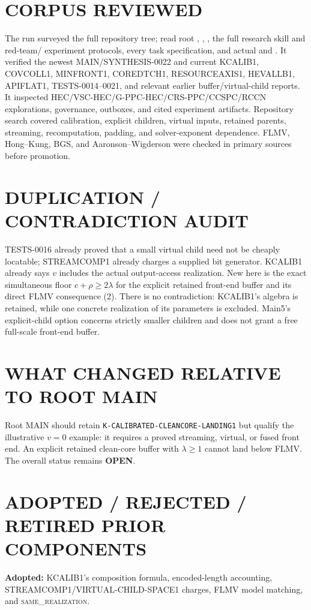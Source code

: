 \documentclass[11pt]{article}
\newcommand{\OPEN}{\textbf{OPEN}}
\newcommand{\same}{\textsc{same\_realization}}
\begin{document}
\section{CORPUS REVIEWED}
The run surveyed the full repository tree; read root ,
, , the full research skill and red-team/
experiment protocols, every task specification, and actual 
and .  It verified the newest MAIN/SYNTHESIS-0022 and current
KCALIB1, COVCOLL1, MINFRONT1, COREDTCH1, RESOURCEAXIS1, HEVALLB1, APIFLAT1,
TESTS-0014--0021, and relevant earlier buffer/virtual-child reports.  It
inspected HEC/VSC-HEC/G-PPC-HEC/CRS-PPC/CCSPC/RCCN explorations, governance,
outboxes, and cited experiment artifacts.  Repository search covered
calibration, explicit children, virtual inputs, retained parents, streaming,
recomputation, padding, and solver-exponent dependence.  FLMV, Hong--Kung,
BGS, and Aaronson--Wigderson were checked in primary sources before promotion.

\section{DUPLICATION / CONTRADICTION AUDIT}
TESTS-0016 already proved that a small virtual child need not be cheaply
locatable; STREAMCOMP1 already charges a supplied bit generator.  KCALIB1
already says $v$ includes the actual output-access realization.  New here is
the exact simultaneous floor $c+\rho\ge2\lambda$ for the explicit retained
front-end buffer and its direct FLMV consequence (2).  There is no
contradiction: KCALIB1's algebra is retained, while one concrete realization
of its parameters is excluded.  Main5's explicit-child option concerns
strictly smaller children and does not grant a free full-scale front-end
buffer.

\section{WHAT CHANGED RELATIVE TO ROOT MAIN}
Root MAIN should retain \texttt{K-CALIBRATED-CLEANCORE-LANDING1} but qualify
the illustrative $v=0$ example: it requires a proved streaming, virtual, or
fused front end.  An explicit retained clean-core buffer with $\lambda\ge1$
cannot land below FLMV.  The overall status remains \OPEN.

\section{ADOPTED / REJECTED / RETIRED PRIOR COMPONENTS}
\textbf{Adopted:} KCALIB1's composition formula, encoded-length accounting,
STREAMCOMP1/VIRTUAL-CHILD-SPACE1 charges, FLMV model matching, and \same{}.
\end{document}
